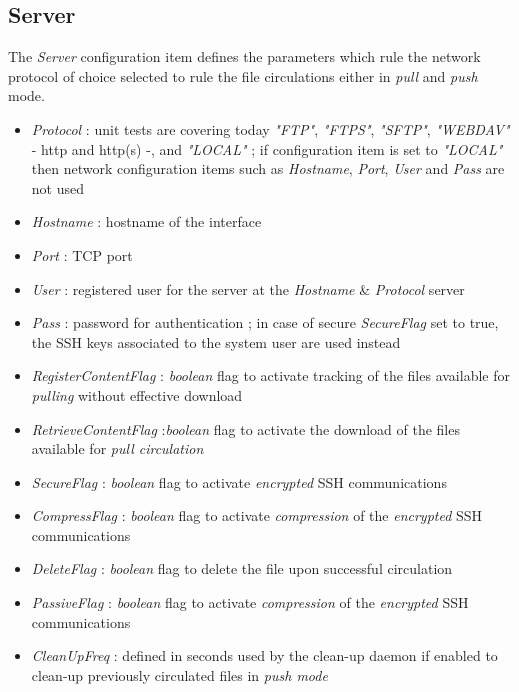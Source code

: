 \documentclass[dec_sum_main.tex]{subfiles}
\begin{document}
\subsection{Server}
The \textit{Server} configuration item defines the parameters which rule the network protocol of choice selected to rule the file circulations either in \textit{pull} and \textit{push} mode.
\par
\noindent
\begin{itemize}
	\item \textit{Protocol} : unit tests are covering today \textit{"FTP"}, \textit{"FTPS"}, \textit{"SFTP"}, \textit{"WEBDAV"} - http and http(s) -, and\textit{ "LOCAL"} ; if configuration item is set to \textit{"LOCAL"} then network configuration items such as \textit{Hostname}, \textit{Port}, \textit{User} and \textit{Pass} are not used   
	\label{Hostname}\item \textit{Hostname} : hostname of the interface
	\item \textit{Port} : TCP port
	\item \textit{User} : registered user for the server at the \textit{Hostname} \& \textit{Protocol} server
	\item \textit{Pass} : password for authentication ; in case of secure \textit{SecureFlag} set to true, the SSH keys associated to the system user are used instead
	\item \textit{RegisterContentFlag} : \textit{boolean} flag to activate tracking of the files available for \textit{pulling} without effective download
	\item \textit{RetrieveContentFlag} :\textit{boolean} flag to activate the download of the files available for \textit{pull circulation} 
	\item \textit{SecureFlag} : \textit{boolean} flag to activate \textit{encrypted} SSH communications
	\item \textit{CompressFlag} : \textit{boolean} flag to activate \textit{compression} of the \textit{encrypted} SSH communications
	\label{DeleteFlag}
	\item \textit{DeleteFlag} : \textit{boolean} flag to delete the file upon successful circulation
	\item \textit{PassiveFlag} : \textit{boolean} flag to activate \textit{compression} of the \textit{encrypted} SSH communications
	\item \textit{CleanUpFreq} : defined in seconds used by the clean-up daemon if enabled to clean-up previously circulated files in \textit{push mode}	
\end{itemize}
\end{document}
